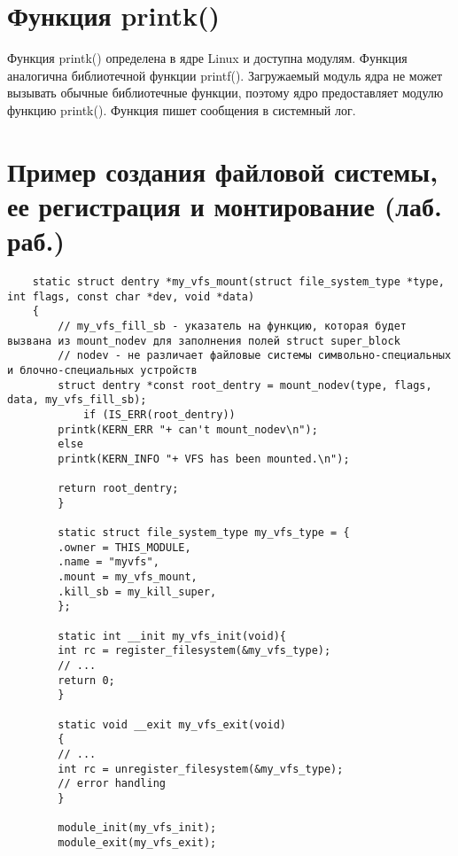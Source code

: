 \section{Функция printk()}
Функция printk() определена в ядре Linux и доступна модулям. Функция аналогична библиотечной функции printf(). Загружаемый модуль ядра не может вызывать обычные библиотечные функции, поэтому ядро предоставляет модулю функцию printk(). Функция пишет сообщения в системный лог.

\section{Пример создания файловой системы, ее регистрация и монтирование (лаб. раб.)}
\begin{lstlisting}
	static struct dentry *my_vfs_mount(struct file_system_type *type, int flags, const char *dev, void *data)
	{
		// my_vfs_fill_sb - указатель на функцию, которая будет вызвана из mount_nodev для заполнения полей struct super_block
		// nodev - не различает файловые системы символьно-специальных и блочно-специальных устройств
		struct dentry *const root_dentry = mount_nodev(type, flags, data, my_vfs_fill_sb);
		    if (IS_ERR(root_dentry))
		printk(KERN_ERR "+ can't mount_nodev\n");
		else
		printk(KERN_INFO "+ VFS has been mounted.\n");
		
		return root_dentry;
		}
		
		static struct file_system_type my_vfs_type = {
		.owner = THIS_MODULE,
		.name = "myvfs",
		.mount = my_vfs_mount,
		.kill_sb = my_kill_super,
		};
		
		static int __init my_vfs_init(void){
		int rc = register_filesystem(&my_vfs_type);
		// ...
		return 0;
		}
		
		static void __exit my_vfs_exit(void)
		{
		// ...
		int rc = unregister_filesystem(&my_vfs_type);
		// error handling
		}
		
		module_init(my_vfs_init);
		module_exit(my_vfs_exit);
	\end{lstlisting}


